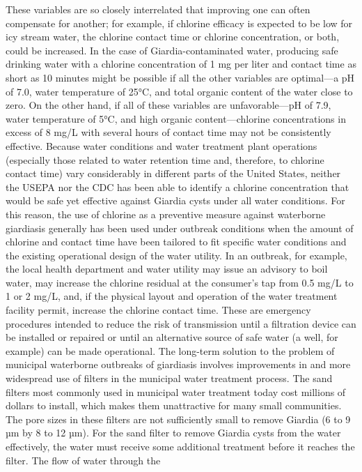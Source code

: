 \documentclass{article}
\begin{document}
These variables are so closely interrelated that improving one can often
compensate for another; for example, if chlorine efficacy is expected to
be low for icy stream water, the chlorine contact time or chlorine
concentration, or both, could be increased. In the case of
Giardia-contaminated water, producing safe drinking water with a
chlorine concentration of 1 mg per liter and contact time as short as 10
minutes might be possible if all the other variables are optimal---a pH
of 7.0, water temperature of 25°C, and total organic content of the
water close to zero. On the other hand, if all of these variables are
unfavorable---pH of 7.9, water temperature of 5°C, and high organic
content---chlorine concentrations in excess of 8 mg/L with several hours
of contact time may not be consistently effective. Because water
conditions and water treatment plant operations (especially those
related to water retention time and, therefore, to chlorine contact
time) vary considerably in different parts of the United States, neither
the USEPA nor the CDC has been able to identify a chlorine concentration
that would be safe yet effective against Giardia cysts under all water
conditions. For this reason, the use of chlorine as a preventive measure
against waterborne giardiasis generally has been used under outbreak
conditions when the amount of chlorine and contact time have been
tailored to fit specific water conditions and the existing operational
design of the water utility. In an outbreak, for example, the local
health department and water utility may issue an advisory to boil water,
may increase the chlorine residual at the consumer's tap from 0.5 mg/L
to 1 or 2 mg/L, and, if the physical layout and operation of the water
treatment facility permit, increase the chlorine contact time. These are
emergency procedures intended to reduce the risk of transmission until a
filtration device can be installed or repaired or until an alternative
source of safe water (a well, for example) can be made operational. The
long-term solution to the problem of municipal waterborne outbreaks of
giardiasis involves improvements in and more widespread use of filters
in the municipal water treatment process. The sand filters most commonly
used in municipal water treatment today cost millions of dollars to
install, which makes them unattractive for many small communities. The
pore sizes in these filters are not sufficiently small to remove Giardia
(6 to 9 µm by 8 to 12 µm). For the sand filter to remove Giardia cysts
from the water effectively, the water must receive some additional
treatment before it reaches the filter. The flow of water through the
\end{document}
